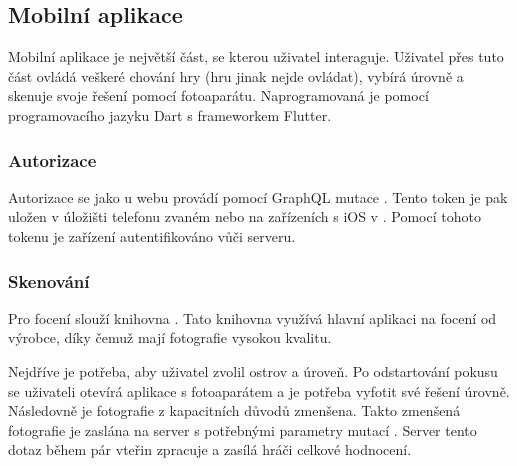 \subsection{Mobilní aplikace}
Mobilní aplikace je největší část, se kterou uživatel interaguje. Uživatel přes tuto část ovládá veškeré chování hry (hru jinak nejde ovládat), vybírá úrovně a skenuje svoje řešení pomocí fotoaparátu. Naprogramovaná je pomocí programovacího jazyku Dart s frameworkem Flutter. 

\subsubsection{Autorizace}
Autorizace se jako u webu provádí pomocí GraphQL mutace . Tento token je pak uložen v úložišti telefonu zvaném \cite{SharedPreferences} nebo na zařízeních s iOS v \cite{NSUserDefaults}. Pomocí tohoto tokenu je zařízení autentifikováno vůči serveru.

\subsubsection{Skenování}
Pro focení slouží knihovna \cite{ImagePicker}. Tato knihovna využívá hlavní aplikaci na focení od výrobce, díky čemuž mají fotografie vysokou kvalitu.\par
Nejdříve je potřeba, aby uživatel zvolil ostrov a úroveň. Po odstartování pokusu se uživateli otevírá aplikace s fotoaparátem a je potřeba vyfotit své řešení úrovně. Následovně je fotografie z kapacitních důvodů zmenšena. Takto zmenšená fotografie je zaslána na server s potřebnými parametry mutací . Server tento dotaz během pár vteřin zpracuje a zasílá hráči celkové hodnocení.
